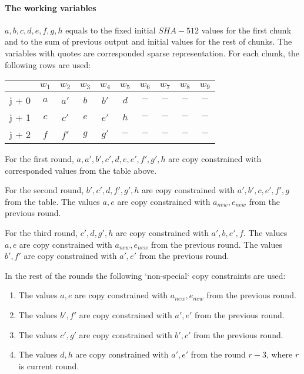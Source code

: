 \paragraph{The working variables}
$ a,  b , c , d, e, f, g, h$ equals to the fixed initial $SHA-512$ values for the first chunk and to the sum of previous output and initial values for the rest of chunks. 
The variables with quotes are corresponded sparse representation.
For each chunk, the following rows are used:
\begin{center}
    \begin{tabular}{ c|c|c|c|c|c|c|c|c|c }
        & $w_1$  & $w_2$  & $w_3$  & $w_4$  & $w_5$  & $w_6$ & $w_7$ & $w_8$ & $w_9$  \\
        \hline
        j + 0 & $a$ & $a'$ & $b$ & $b' $  & $d$  & $-$   & $-$ & $-$  & $-$   \\
        j + 1 & $c$  & $c'$ & $e$ & $e'$ & $h$ & $-$ & $-$ & $-$ & $-$ \\
        j + 2 & $f$ & $f'$ & $g$ & $g'$ & $-$ & $-$ & $-$ & $-$ & $-$\\
    \end{tabular}
\end{center}
For the first round, $a, a', b', c' , d, e, e', f', g', h$ are copy constrained with corresponded values from the table above.

For the second round, $b', c' , d, f', g', h$ are copy constrained with $a', b', c, e', f', g$ from the table.
The values $a, e$ are copy constrained with $a_{new}, e_{new}$ from the previous round.

For the third round, $c' , d, g', h$ are copy constrained with $a', b, e', f$.
The values $a, e$ are copy constrained with $a_{new}, e_{new}$ from the previous round.
The values $b', f'$ are copy constrained with $a', e'$ from the previous round.

In the rest of the rounds the following `non-special` copy constraints are used:
\begin{enumerate}
\item The values $a, e$ are copy constrained with $a_{new}, e_{new}$ from the previous round.
\item The values $b', f'$ are copy constrained with $a', e'$ from the previous round.
\item The values $c', g'$ are copy constrained with $b', c'$ from the previous round.
\item The values $d, h$ are copy constrained with $a', e'$ from the round $r - 3$, where $r$ is current round.
\end{enumerate}

